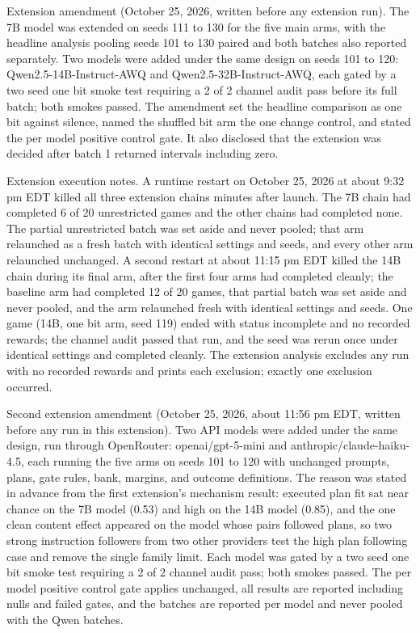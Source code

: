 \documentclass[11pt]{article}
\begin{document}
Extension amendment (October 25, 2026, written before any extension
run). The 7B model was extended on seeds 111 to 130 for the five main
arms, with the headline analysis pooling seeds 101 to 130 paired and
both batches also reported separately. Two models were added under the
same design on seeds 101 to 120: Qwen2.5-14B-Instruct-AWQ and
Qwen2.5-32B-Instruct-AWQ, each gated by a two seed one bit smoke test
requiring a 2 of 2 channel audit pass before its full batch; both smokes
passed. The amendment set the headline comparison as one bit against
silence, named the shuffled bit arm the one change control, and stated
the per model positive control gate. It also disclosed that the
extension was decided after batch 1 returned intervals including zero.

Extension execution notes. A runtime restart on October 25, 2026 at
about 9:32 pm EDT killed all three extension chains minutes after
launch. The 7B chain had completed 6 of 20 unrestricted games and the
other chains had completed none. The partial unrestricted batch was set
aside and never pooled; that arm relaunched as a fresh batch with
identical settings and seeds, and every other arm relaunched unchanged.
A second restart at about 11:15 pm EDT killed the 14B chain during its
final arm, after the first four arms had completed cleanly; the baseline
arm had completed 12 of 20 games, that partial batch was set aside and
never pooled, and the arm relaunched fresh with identical settings and
seeds. One game (14B, one bit arm, seed 119) ended with status
incomplete and no recorded rewards; the channel audit passed that run,
and the seed was rerun once under identical settings and completed
cleanly. The extension analysis excludes any run with no recorded
rewards and prints each exclusion; exactly one exclusion occurred.

Second extension amendment (October 25, 2026, about 11:56 pm EDT,
written before any run in this extension). Two API models were added
under the same design, run through OpenRouter: openai/gpt-5-mini and
anthropic/claude-haiku-4.5, each running the five arms on seeds 101 to
120 with unchanged prompts, plans, gate rules, bank, margins, and
outcome definitions. The reason was stated in advance from the first
extension's mechanism result: executed plan fit sat near chance on the
7B model (0.53) and high on the 14B model (0.85), and the one clean
content effect appeared on the model whose pairs followed plans, so two
strong instruction followers from two other providers test the high plan
following case and remove the single family limit. Each model was gated
by a two seed one bit smoke test requiring a 2 of 2 channel audit pass;
both smokes passed. The per model positive control gate applies
unchanged, all results are reported including nulls and failed gates,
and the batches are reported per model and never pooled with the Qwen
batches.
\end{document}

